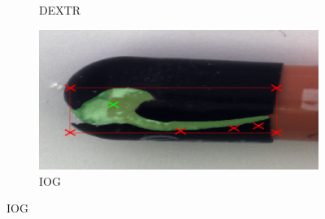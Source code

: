 \begin{figure}
\begin{subfigure}[t]{0.3\textwidth}
		\caption{
			DEXTR
		}
	\end{subfigure}
	\hfill
	\begin{subfigure}[t]{0.3\textwidth}
		\centering
		\includegraphics[width=\textwidth]{figures/appendix/method_predictions/pill78_iog.png}
		\caption{
			IOG
		}
	\end{subfigure}
\end{figure}

